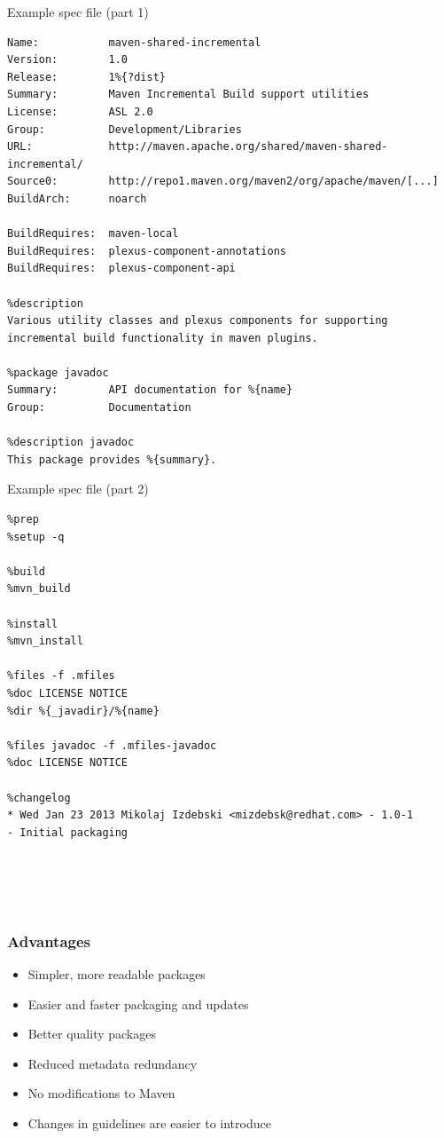 \documentclass[pdftex,unicode,xcolor=table]{beamer}
\begin{document}
\begin{frame}[fragile]
  \begin{block}{Example spec file (part 1)}
    \scriptsize
\begin{verbatim}
Name:           maven-shared-incremental
Version:        1.0
Release:        1%{?dist}
Summary:        Maven Incremental Build support utilities
License:        ASL 2.0
Group:          Development/Libraries
URL:            http://maven.apache.org/shared/maven-shared-incremental/
Source0:        http://repo1.maven.org/maven2/org/apache/maven/[...]
BuildArch:      noarch

BuildRequires:  maven-local
BuildRequires:  plexus-component-annotations
BuildRequires:  plexus-component-api

%description
Various utility classes and plexus components for supporting
incremental build functionality in maven plugins.

%package javadoc
Summary:        API documentation for %{name}
Group:          Documentation

%description javadoc
This package provides %{summary}.
\end{verbatim}
  \end{block}
\end{frame}


\begin{frame}[fragile]
  \begin{block}{Example spec file (part 2)}
    \scriptsize
\begin{verbatim}
%prep
%setup -q

%build
%mvn_build

%install
%mvn_install

%files -f .mfiles
%doc LICENSE NOTICE
%dir %{_javadir}/%{name}

%files javadoc -f .mfiles-javadoc
%doc LICENSE NOTICE

%changelog
* Wed Jan 23 2013 Mikolaj Izdebski <mizdebsk@redhat.com> - 1.0-1
- Initial packaging





\end{verbatim}
  \end{block}
\end{frame}

\begin{frame}
  \frametitle{Advantages}
  \begin{itemize}
    \item Simpler, more readable packages
    \item Easier and faster packaging and updates
    \item Better quality packages
    \item Reduced metadata redundancy
    \item No modifications to Maven
    \item Changes in guidelines are easier to introduce
  \end{itemize}
\end{frame}
\end{document}
